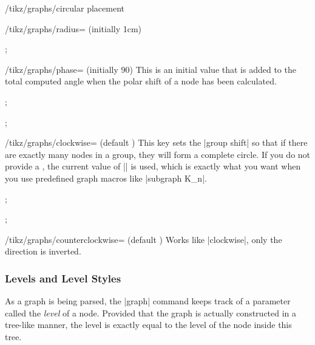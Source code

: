 \begin{key}{/tikz/graphs/circular placement}
\begin{key}{/tikz/graphs/radius= (initially 1cm)}
\begin{codeexample}[preamble={\usetikzlibrary{graphs}}]
\tikz {};
\end{codeexample}
    \end{key}
    \begin{key}{/tikz/graphs/phase= (initially 90)}
        This is an initial value that is added to the total computed angle when
        the polar shift of a node has been calculated.
\begin{codeexample}[preamble={\usetikzlibrary{graphs}}]
\tikz {};
\end{codeexample}
\begin{codeexample}[preamble={\usetikzlibrary{graphs}}]
\tikz {};
\end{codeexample}
    \end{key}
\end{key}

\label{key-graphs-clockwise}%
\begin{key}{/tikz/graphs/clockwise= (default \string\tikzgraphVnum)}
    This key sets the |group shift| so that if there are exactly 
    many nodes in a group, they will form a complete circle. If you do not
    provide a , the current value of |\tikzgraphVnum| is used,
    which is exactly what you want when you use predefined graph macros like
    |subgraph K_n|.
\begin{codeexample}[preamble={\usetikzlibrary{graphs}}]
\tikz {};
\end{codeexample}
\begin{codeexample}[preamble={\usetikzlibrary{graphs.standard}}]
\tikz {};
\end{codeexample}
\end{key}

\label{key-graphs-counterclockwise}%
\begin{key}{/tikz/graphs/counterclockwise= (default \string\tikzgraphVnum)}
    Works like |clockwise|, only the direction is inverted.
\end{key}


\subsubsection{Levels and Level Styles}

As a graph is being parsed, the |graph| command keeps track of a parameter
called the \emph{level} of a node. Provided that the graph is actually
constructed in a tree-like manner, the level is exactly equal to the level of
the node inside this tree.

